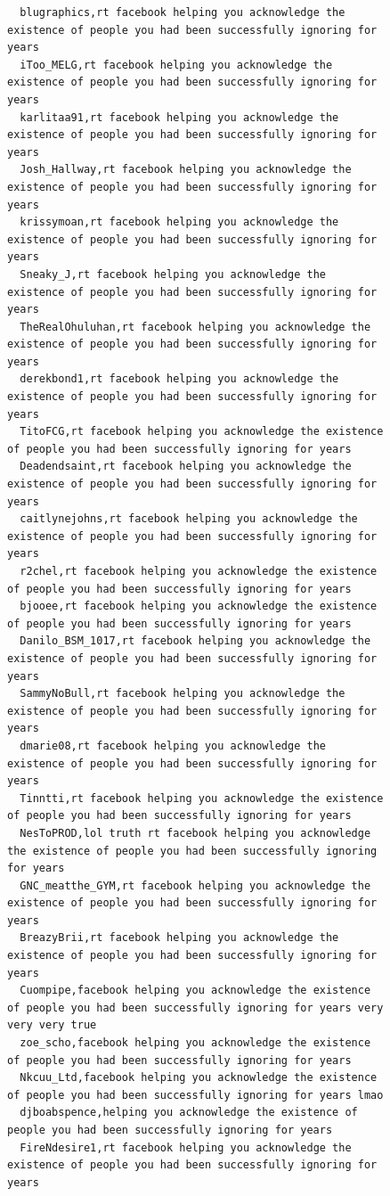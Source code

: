 \begin{figure}[htpb]
\begin{verbatim}
  blugraphics,rt facebook helping you acknowledge the existence of people you had been successfully ignoring for years
  iToo_MELG,rt facebook helping you acknowledge the existence of people you had been successfully ignoring for years
  karlitaa91,rt facebook helping you acknowledge the existence of people you had been successfully ignoring for years
  Josh_Hallway,rt facebook helping you acknowledge the existence of people you had been successfully ignoring for years
  krissymoan,rt facebook helping you acknowledge the existence of people you had been successfully ignoring for years
  Sneaky_J,rt facebook helping you acknowledge the existence of people you had been successfully ignoring for years
  TheRealOhuluhan,rt facebook helping you acknowledge the existence of people you had been successfully ignoring for years
  derekbond1,rt facebook helping you acknowledge the existence of people you had been successfully ignoring for years
  TitoFCG,rt facebook helping you acknowledge the existence of people you had been successfully ignoring for years
  Deadendsaint,rt facebook helping you acknowledge the existence of people you had been successfully ignoring for years
  caitlynejohns,rt facebook helping you acknowledge the existence of people you had been successfully ignoring for years
  r2chel,rt facebook helping you acknowledge the existence of people you had been successfully ignoring for years
  bjooee,rt facebook helping you acknowledge the existence of people you had been successfully ignoring for years
  Danilo_BSM_1017,rt facebook helping you acknowledge the existence of people you had been successfully ignoring for years
  SammyNoBull,rt facebook helping you acknowledge the existence of people you had been successfully ignoring for years
  dmarie08,rt facebook helping you acknowledge the existence of people you had been successfully ignoring for years
  Tinntti,rt facebook helping you acknowledge the existence of people you had been successfully ignoring for years
  NesToPROD,lol truth rt facebook helping you acknowledge the existence of people you had been successfully ignoring for years
  GNC_meatthe_GYM,rt facebook helping you acknowledge the existence of people you had been successfully ignoring for years
  BreazyBrii,rt facebook helping you acknowledge the existence of people you had been successfully ignoring for years
  Cuompipe,facebook helping you acknowledge the existence of people you had been successfully ignoring for years very very very true
  zoe_scho,facebook helping you acknowledge the existence of people you had been successfully ignoring for years
  Nkcuu_Ltd,facebook helping you acknowledge the existence of people you had been successfully ignoring for years lmao
  djboabspence,helping you acknowledge the existence of people you had been successfully ignoring for years
  FireNdesire1,rt facebook helping you acknowledge the existence of people you had been successfully ignoring for years


\end{verbatim}
\end{figure}
